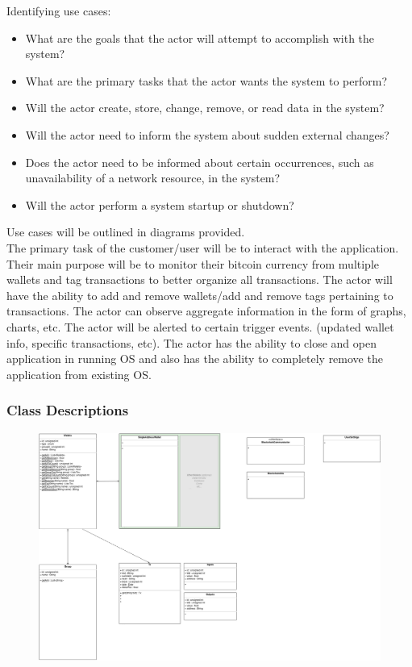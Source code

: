Identifying use cases:\\
\begin{itemize}
\item What are the goals that the actor will attempt to accomplish with the system?
\item What are the primary tasks that the actor wants the system to perform?
\item Will the actor create, store, change, remove, or read data in the system?
\item Will the actor need to inform the system about sudden external changes?
\item Does the actor need to be informed about certain occurrences, such as unavailability of a network resource, in the system?
\item Will the actor perform a system startup or shutdown?
\end{itemize}

Use cases will be outlined in diagrams provided.\\ 

The primary task of the customer/user will be to interact with the application.  Their main purpose will be to monitor their bitcoin currency from multiple wallets and tag transactions to better organize all transactions.  The actor will have the ability to add and remove wallets/add and remove tags pertaining to transactions. The actor can observe aggregate information in the form of graphs, charts, etc.  The actor will be alerted to certain trigger events. (updated wallet info, specific transactions, etc).  The actor has the ability to close and open application in running OS and also has the ability to completely remove the application from existing OS. \\
	
	
    \subsubsection{Class Descriptions}
      \begin{figure}[H]
        \includegraphics[width=1.0\textwidth]{../diagrams/classes_model.png}
      \end{figure}

